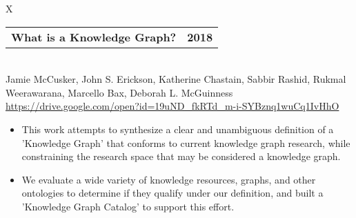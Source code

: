 \documentclass[10pt]{article}
\newcommand{\tabularxwidth}{\textwidth}
\begin{document}
        \begin{minipage}{\tabularxwidth}
        \begin{tabularx}{\tabularxwidth}{X}
            {
                \begin{tabularx}{\tabularxwidth}{@{}X r}
                    \textbf{What is a Knowledge Graph?} &
                    \textbf{
        2018} \\
                \end{tabularx}
            } \\
            Jamie McCusker, John S. Erickson, Katherine Chastain, Sabbir Rashid, Rukmal Weerawarana, Marcello Bax, Deborah L. McGuinness \\

            
            
                \url{https://drive.google.com/open?id=19uND_fkRTd_m-i-SYBznq1wuCq1IvHhO} \\
            
            
        \end{tabularx}

        \begin{itemize}[noitemsep, topsep=3pt, parsep=0pt, partopsep=0pt]
            
                \item 
    This work attempts to synthesize a clear and unambiguous definition of a 'Knowledge Graph' that conforms to current knowledge graph research, while constraining the research space that may be considered a knowledge graph.
            
                \item 
    We evaluate a wide variety of knowledge resources, graphs, and other ontologies to determine if they qualify under our definition, and built a 'Knowledge Graph Catalog' to support this effort.
            
        \end{itemize}

        

        \end{minipage}
    
\end{document}
